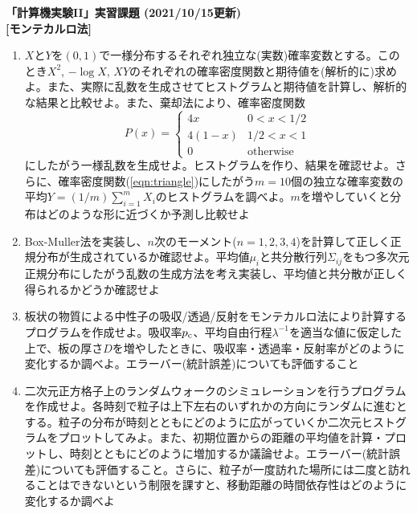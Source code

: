 \documentclass[11pt]{jarticle}
\begin{document}
\noindent
{\bf\large 「計算機実験II」実習課題 (2021/10/15更新)}
\\[-0.5em]

{\bf [モンテカルロ法]}
\begin{enumerate}

\item $X$と$Y$を$(0,1)$で一様分布するそれぞれ独立な(実数)確率変数とする。このとき$X^2$, $-\log X$, $XY$のそれぞれの確率密度関数と期待値を(解析的に)求めよ。また、実際に乱数を生成させてヒストグラムと期待値を計算し、解析的な結果と比較せよ。また、棄却法により、確率密度関数
  \begin{equation}
    P(x) = \begin{cases} 4x & 0 < x < 1/2 \\
      4(1-x) & 1/2 < x < 1 \\
      0 & \text{otherwise}
    \end{cases}
    \label{eqn:triangle}
  \end{equation}
  にしたがう一様乱数を生成せよ。ヒストグラムを作り、結果を確認せよ。さらに、確率密度関数(\ref{eqn:triangle})にしたがう$m=10$個の独立な確率変数の平均$Y=(1/m) \sum_{i=1}^m X_i$のヒストグラムを調べよ。$m$を増やしていくと分布はどのような形に近づくか予測し比較せよ
  
\item Box-Muller法を実装し、$n$次のモーメント($n=1,2,3,4$)を計算して正しく正規分布が生成されているか確認せよ。平均値$\mu_i$と共分散行列$\Sigma_{ij}$をもつ多次元正規分布にしたがう乱数の生成方法を考え実装し、平均値と共分散が正しく得られるかどうか確認せよ

\item 板状の物質による中性子の吸収/透過/反射をモンテカルロ法により計算するプログラムを作成せよ。吸収率$p_{\rm c}$、平均自由行程$\lambda^{-1}$を適当な値に仮定した上で、板の厚さ$D$を増やしたときに、吸収率・透過率・反射率がどのように変化するか調べよ。エラーバー(統計誤差)についても評価すること

\item 二次元正方格子上のランダムウォークのシミュレーションを行うプログラムを作成せよ。各時刻で粒子は上下左右のいずれかの方向にランダムに進むとする。粒子の分布が時刻とともにどのように広がっていくか二次元ヒストグラムをプロットしてみよ。また、初期位置からの距離の平均値を計算・プロットし、時刻とともにどのように増加するか議論せよ。エラーバー(統計誤差)についても評価すること。さらに、粒子が一度訪れた場所には二度と訪れることはできないという制限を課すと、移動距離の時間依存性はどのように変化するか調べよ
  

\end{enumerate}
\end{document}

